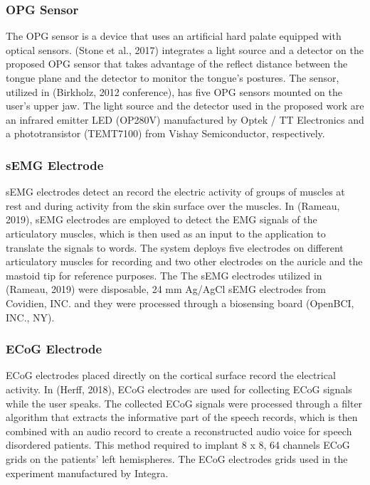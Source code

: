 \subsubsection{OPG Sensor}
The OPG sensor is a device that uses an artificial hard palate equipped with optical sensors.  (Stone et al., 2017) integrates a light source and a detector on the proposed OPG sensor that takes advantage of the reflect distance between the tongue plane and the detector to monitor the tongue's postures. 
The sensor, utilized in (Birkholz, 2012 conference), has five OPG sensors mounted on the user's upper jaw. The light source and the detector used in the proposed work are an infrared emitter LED (OP280V) manufactured by Optek / TT Electronics and a phototransistor (TEMT7100) from Vishay Semiconductor, respectively.

\subsubsection{sEMG Electrode}
sEMG electrodes detect an record the electric activity of groups of muscles at rest and during activity from the skin surface over the muscles. In (Rameau, 2019), sEMG electrodes are employed to detect the EMG signals of the articulatory muscles, which is then used as an input to the application to translate the signals to words. The system deploys five electrodes on different articulatory muscles for recording and two other electrodes on the auricle and the mastoid tip for reference purposes. The The sEMG electrodes utilized in (Rameau, 2019) were disposable, 24 mm Ag/AgCl sEMG electrodes from Covidien, INC. and they were processed through a biosensing board (OpenBCI, INC., NY).

\subsubsection{ECoG Electrode}
ECoG electrodes placed directly on the cortical surface record the electrical activity. In (Herff, 2018), ECoG electrodes are used for collecting ECoG signals while the user speaks. The collected ECoG signals were processed through a filter algorithm that extracts the informative part of the speech records, which is then combined with an audio record to create a reconstructed audio voice for speech disordered patients. This method required to implant 8 x 8, 64 channels ECoG grids on the patients' left hemispheres. The ECoG electrodes grids used in the experiment manufactured by Integra.

